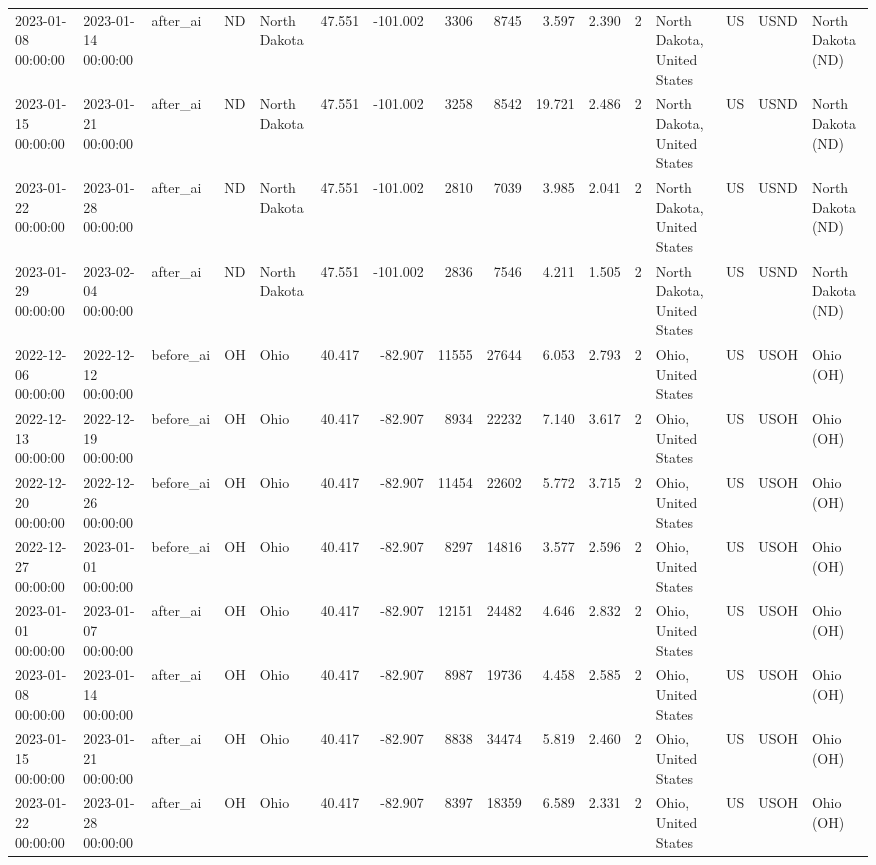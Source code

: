 \begin{tabular}{lllllrrrrrrlllll}
2023-01-08 00:00:00 & 2023-01-14 00:00:00 & after\_ai & ND & North Dakota & 47.551 & -101.002 & 3306 & 8745 & 3.597 & 2.390 & 2 & North Dakota, United States & US & USND & North Dakota (ND) \\
2023-01-15 00:00:00 & 2023-01-21 00:00:00 & after\_ai & ND & North Dakota & 47.551 & -101.002 & 3258 & 8542 & 19.721 & 2.486 & 2 & North Dakota, United States & US & USND & North Dakota (ND) \\
2023-01-22 00:00:00 & 2023-01-28 00:00:00 & after\_ai & ND & North Dakota & 47.551 & -101.002 & 2810 & 7039 & 3.985 & 2.041 & 2 & North Dakota, United States & US & USND & North Dakota (ND) \\
2023-01-29 00:00:00 & 2023-02-04 00:00:00 & after\_ai & ND & North Dakota & 47.551 & -101.002 & 2836 & 7546 & 4.211 & 1.505 & 2 & North Dakota, United States & US & USND & North Dakota (ND) \\
2022-12-06 00:00:00 & 2022-12-12 00:00:00 & before\_ai & OH & Ohio & 40.417 & -82.907 & 11555 & 27644 & 6.053 & 2.793 & 2 & Ohio, United States & US & USOH & Ohio (OH) \\
2022-12-13 00:00:00 & 2022-12-19 00:00:00 & before\_ai & OH & Ohio & 40.417 & -82.907 & 8934 & 22232 & 7.140 & 3.617 & 2 & Ohio, United States & US & USOH & Ohio (OH) \\
2022-12-20 00:00:00 & 2022-12-26 00:00:00 & before\_ai & OH & Ohio & 40.417 & -82.907 & 11454 & 22602 & 5.772 & 3.715 & 2 & Ohio, United States & US & USOH & Ohio (OH) \\
2022-12-27 00:00:00 & 2023-01-01 00:00:00 & before\_ai & OH & Ohio & 40.417 & -82.907 & 8297 & 14816 & 3.577 & 2.596 & 2 & Ohio, United States & US & USOH & Ohio (OH) \\
2023-01-01 00:00:00 & 2023-01-07 00:00:00 & after\_ai & OH & Ohio & 40.417 & -82.907 & 12151 & 24482 & 4.646 & 2.832 & 2 & Ohio, United States & US & USOH & Ohio (OH) \\
2023-01-08 00:00:00 & 2023-01-14 00:00:00 & after\_ai & OH & Ohio & 40.417 & -82.907 & 8987 & 19736 & 4.458 & 2.585 & 2 & Ohio, United States & US & USOH & Ohio (OH) \\
2023-01-15 00:00:00 & 2023-01-21 00:00:00 & after\_ai & OH & Ohio & 40.417 & -82.907 & 8838 & 34474 & 5.819 & 2.460 & 2 & Ohio, United States & US & USOH & Ohio (OH) \\
2023-01-22 00:00:00 & 2023-01-28 00:00:00 & after\_ai & OH & Ohio & 40.417 & -82.907 & 8397 & 18359 & 6.589 & 2.331 & 2 & Ohio, United States & US & USOH & Ohio (OH) \\

\end{tabular}
